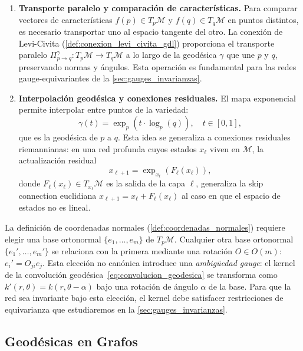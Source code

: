 \begin{remark}
\begin{enumerate}
	\item \textbf{Transporte paralelo y comparación de características.} Para comparar vectores de características $f(p) \in T_p\mathcal{M}$ y $f(q) \in T_q\mathcal{M}$ en puntos distintos, es necesario transportar uno al espacio tangente del otro. La conexión de Levi-Civita (\autoref{def:conexion_levi_civita_gdl}) proporciona el transporte paralelo $\Pi_{p \to q}^{\gamma}: T_p\mathcal{M} \to T_q\mathcal{M}$ a lo largo de la geodésica $\gamma$ que une $p$ y $q$, preservando normas y ángulos. Esta operación es fundamental para las redes gauge-equivariantes de la \autoref{sec:gauges_invarianzas}.

	\item \textbf{Interpolación geodésica y conexiones residuales.} El mapa exponencial permite interpolar entre puntos de la variedad:
	\[
	\gamma(t) = \exp_p(t \cdot \log_p(q)), \quad t \in [0,1],
	\]
	que es la geodésica de $p$ a $q$. Esta idea se generaliza a conexiones residuales riemannianas: en una red profunda cuyos estados $x_\ell$ viven en $\mathcal{M}$, la actualización residual
	\begin{equation}\label{eq:residual_riemanniana}
	x_{\ell+1} = \exp_{x_\ell}(F_\ell(x_\ell)),
	\end{equation}
	donde $F_\ell(x_\ell) \in T_{x_\ell}\mathcal{M}$ es la salida de la capa $\ell$, generaliza la skip connection euclidiana $x_{\ell+1} = x_\ell + F_\ell(x_\ell)$ al caso en que el espacio de estados no es lineal.
\end{enumerate}
\end{remark}

\begin{remark}\label{rem:ambiguedad_gauge_normales}
La definición de coordenadas normales (\autoref{def:coordenadas_normales}) requiere elegir una base ortonormal $\{e_1, \ldots, e_m\}$ de $T_p\mathcal{M}$. Cualquier otra base ortonormal $\{e_1', \ldots, e_m'\}$ se relaciona con la primera mediante una rotación $O \in O(m)$: $e_i' = O_{ji} e_j$. Esta elección no canónica introduce una \textit{ambigüedad gauge}: el kernel de la convolución geodésica~\eqref{eq:convolucion_geodesica} se transforma como $k'(r, \theta) = k(r, \theta - \alpha)$ bajo una rotación de ángulo $\alpha$ de la base. Para que la red sea invariante bajo esta elección, el kernel debe satisfacer restricciones de equivarianza que estudiaremos en la \autoref{sec:gauges_invarianzas}.
\end{remark}

\subsection{Geodésicas en Grafos}\label{subsec:geodesicas_grafos}

